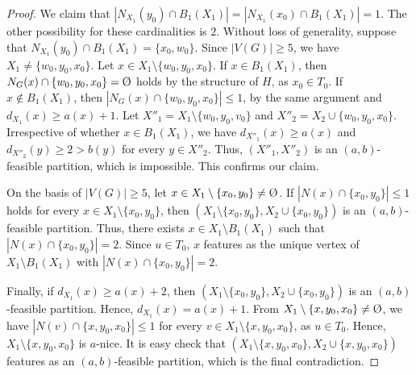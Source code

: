 \documentclass[10pt,a4paper]{amsart}
\def\emptyset{\mbox{{\rm \O}}}
\begin{document}
\begin{proof}
We claim that  $|N_{X_1}(y_0)\cap B_1(X_1)|=|N_{X_1}(x_0)\cap B_1(X_1)|=1$. The other possibility for these cardinalities is $2$. Without loss of generality, suppose that   $ N_{X_1}(y_0)\cap B_1(X_1)=\{x_0,w_0\} $.
Since $|V(G)|\ge 5$, we have  $X_1\ne \{w_0,y_0,x_0\}$.
Let $x\in X_1\setminus \{w_0,y_0,x_0\}$. If $x\in B_1(X_1)$, then $N_G(x)\cap \{w_0,y_0,x_0\}=\emptyset$ holds by the structure of $H$, as $x_0\in T_0$. If   $x\not\in B_1(X_1)$, then $|N_G(x)\cap \{w_0,y_0,x_0\}|\le 1$, by the same argument  and $d_{X_1}(x)\ge a(x)+1$. Let $X''_1=X_1\setminus \{w_0,y_0,v_0\}$ and $X''_2=X_2\cup \{w_0,y_0,x_0\}$. Irrespective of whether $x\in B_1(X_1)$, we have $d_{X''_1}(x)\ge a(x)$ and $d_{X''_2}(y)\ge 2>b(y)$ for every $y\in X''_2$. Thus, $(X''_1, X''_2)$ is an $(a, b) $-feasible partition, which is impossible. This confirms our claim.

  On the basis of $ |V(G)|\ge 5 $, let $x\in X_1\setminus\{x_0,y_0\}\neq\emptyset $.
  If $ \left| N(x)\cap \{x_0,y_0\}\right|\le 1$ holds  for every $x\in X_1\setminus\{x_0,y_0\}$, then     $(X_1\setminus\{x_0,y_0\}, X_2\cup\{x_0,y_0\})$ is an $ (a,b) $-feasible partition. Thus, there exists   $x\in X_1\setminus B_1(X_1)$ such that  $ \left| N(x)\cap \{x_0,y_0\}\right|=2$.   Since $u\in T_0$,  $x$ features as the unique vertex of  $ X_1\setminus B_1(X_1) $ with  $ \left| N(x)\cap \{x_0,y_0\}\right|=2$.

  Finally, if $ d_{X_1}(x)\ge a(x)+2 $, then $ (X_1\setminus\{x_0,y_0\}, X_2\cup\{x_0,y_0\}) $ is an $ (a,b) $-feasible partition. Hence, $d_{X_1}(x)=a(x)+1 $. From $ X_1\setminus\{x,y_0,x_0\}\neq\emptyset $, we have $ \left|N(v)\cap\{x,y_0,x_0\} \right|\le 1 $ for every $ v\in X_1\setminus\{x,y_0,x_0\}$, as $u\in T_0$. Hence, $ X_1\setminus\{x,y_0,x_0\} $ is $ a $-nice. It  is easy check  that $(X_1\setminus\{x,y_0,x_0\}, X_2\cup \{x,y_0,x_0\})$ features as an $(a,b)$-feasible partition, which is the final contradiction. \end{proof}
\end{document}
